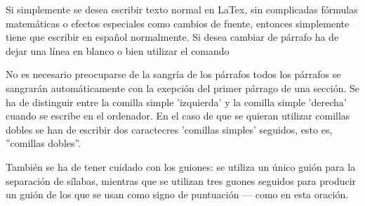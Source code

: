 \documentclass[a4paper,10pt]{letter}
\begin{document}
Si simplemente se desea escribir texto normal en LaTex,
sin complicadas f\'ormulas matem\'aticas o efectos especiales
como cambios de fuente, entonces simplemente tiene que escribir
en espa\~nol normalmente.
Si desea cambiar de párrafo ha de dejar una línea en blanco o bien
utilizar el comando \par
No es necesario preocuparse de la sangría de los párrafos
todos los párrafos se sangrarán automáticamente con la exepción
del primer párrago de una sección.
Se ha de distinguir entre la comilla simple 'izquierda'
y la comilla simple 'derecha' cuando se escribe en el ordenador.
En el caso de que se quieran utilizar comillas dobles se han de 
escribir dos caractecres 'comillas simples' seguidos, esto es,
''comillas dobles''. \par
También se ha de tener cuidado con los guiones: se utiliza un único
guión para la separación de sílabas, mientras que se utilizan
tres guones seguidos para producir un guión de los que se usan
como signo de puntuación --- como en esta oración.
\end{document}
